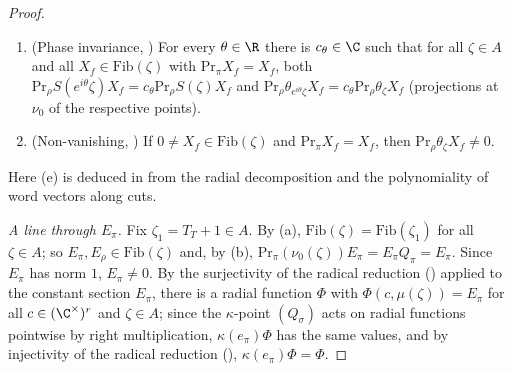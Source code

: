 \begin{proof}
\begin{enumerate}[label=(\alph*)]
  value $X_0$ at all points $(c,\mu(\zeta))$, then for every $c$ and $Y$ the function $\zeta\mapsto(t_L(Y)\Phi)(c,\mu(\zeta))$
  is a finite sum $\sum_ia_i(\zeta)v_i$ with fixed vectors $v_i$ and functions $a_i$ satisfying $g^{m_i}a_i=p_i(\zeta,\bar\zeta,
  \varsigma)$ on $A$ for some $m_i$ and polynomials $p_i$ (notation of \cref{pf:thmS-carrier:phaseextract}); here $t_L(Y)$ is
  the radial operator in the last variable.
\item (Phase invariance,
  ) For every $\theta\in\R$ there is
  $c_\theta\in\C$ such that for all $\zeta\in A$ and all $X_f\in\mathrm{Fib}(\zeta)$ with $\mathrm{Pr}_\pi X_f=X_f$, both
  $\mathrm{Pr}_\rho S(e^{i\theta}\zeta)X_f=c_\theta\mathrm{Pr}_\rho S(\zeta)X_f$ and $\mathrm{Pr}_\rho\theta_{e^{i\theta}\zeta}X_f
  =c_\theta\mathrm{Pr}_\rho\theta_\zeta X_f$ (projections at $\nu_0$ of the respective points).
\item (Non-vanishing,
  ) If $0\ne X_f\in\mathrm{Fib}(\zeta)$
  and $\mathrm{Pr}_\pi X_f=X_f$, then $\mathrm{Pr}_\rho\theta_\zeta X_f\ne0$.
\end{enumerate}
Here (e) is deduced in  from the radial
decomposition and the polynomiality of word vectors along cuts.

\emph{A line through $E_\pi$.} Fix $\zeta_1=T_T+1\in A$. By (a), $\mathrm{Fib}(\zeta)=\mathrm{Fib}(\zeta_1)$ for all
$\zeta\in A$; so $E_\pi,E_\rho\in\mathrm{Fib}(\zeta)$ and, by (b), $\mathrm{Pr}_\pi(\nu_0(\zeta))E_\pi=E_\pi Q_\pi=E_\pi$.
Since $E_\pi$ has norm $1$, $E_\pi\ne0$. By the surjectivity of the radical reduction
() applied to the constant section $E_\pi$, there is a radial
function $\Phi$ with $\Phi(c,\mu(\zeta))=E_\pi$ for all $c\in(\C^\times)^r$ and $\zeta\in A$; since the $\kappa$-point
$(Q_\sigma)$ acts on radial functions pointwise by right multiplication, $\kappa(e_\pi)\Phi$ has the same values, and by
injectivity of the radical reduction (),
$\kappa(e_\pi)\Phi=\Phi$.


\end{proof}

